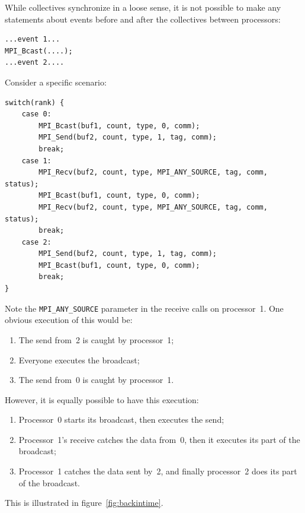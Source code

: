 While collectives synchronize in a loose sense, it is not possible to
make any statements about events before and after the collectives
between processors:
\begin{lstlisting}
...event 1...
MPI_Bcast(....);
...event 2....
\end{lstlisting}
Consider a specific scenario:
\begin{lstlisting}
switch(rank) { 
    case 0: 
        MPI_Bcast(buf1, count, type, 0, comm); 
        MPI_Send(buf2, count, type, 1, tag, comm); 
        break; 
    case 1: 
        MPI_Recv(buf2, count, type, MPI_ANY_SOURCE, tag, comm, status); 
        MPI_Bcast(buf1, count, type, 0, comm); 
        MPI_Recv(buf2, count, type, MPI_ANY_SOURCE, tag, comm, status); 
        break; 
    case 2: 
        MPI_Send(buf2, count, type, 1, tag, comm); 
        MPI_Bcast(buf1, count, type, 0, comm); 
        break; 
}
\end{lstlisting}
Note the \lstinline$MPI_ANY_SOURCE$ parameter in the receive calls on processor~1.
One obvious execution of this would be:
\begin{enumerate}
\item The send from~2 is caught by processor~1;
\item Everyone executes the broadcast;
\item The send from~0 is caught by processor~1.
\end{enumerate}
However, it is equally possible to have this execution:
\begin{enumerate}
\item Processor~0 starts its broadcast, then executes the send;
\item Processor~1's receive catches the data from~0, then it executes
  its part of the broadcast;
\item Processor~1 catches the data sent by~2, and finally processor~2
  does its part of the broadcast.
\end{enumerate}

This is illustrated in figure~\ref{fig:backintime}.
